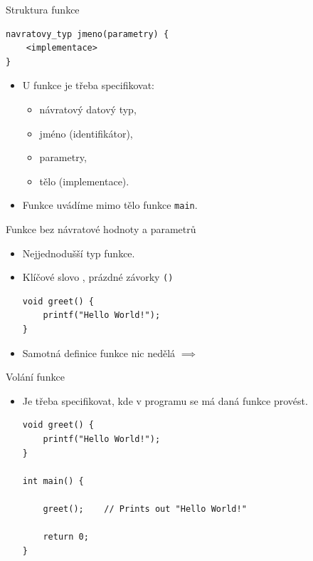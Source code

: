 \documentclass[14pt,aspectratio=169]{beamer}
\begin{document}
    \begin{frame}[t,fragile]{Struktura funkce}
        \begin{lstlisting}
navratovy_typ jmeno(parametry) {
    <implementace>
}
        \end{lstlisting}
        \begin{itemize}
            \item U funkce je třeba specifikovat:
            \begin{itemize}
                \item návratový datový typ,
                \item jméno (identifikátor),
                \item parametry,
                \item tělo (implementace).
            \end{itemize}
            \item Funkce uvádíme mimo tělo funkce \texttt{main}.
        \end{itemize}
    \end{frame}

    \begin{frame}[t,fragile]{Funkce bez návratové hodnoty a parametrů}
        \begin{itemize}
            \item Nejjednodušší typ funkce.
            \item Klíčové slovo , prázdné závorky \texttt{()}
            \begin{lstlisting}
void greet() {
    printf("Hello World!");
}
            \end{lstlisting}
            \item Samotná definice funkce nic nedělá $\implies$ 
        \end{itemize}
    \end{frame}

    \begin{frame}[t,fragile]{Volání funkce}
        \begin{itemize}
            \item Je třeba specifikovat, kde v programu se má daná funkce provést.
            \begin{lstlisting}
void greet() {
    printf("Hello World!");
}
            
int main() {

    greet();    // Prints out "Hello World!"

    return 0;
}
            \end{lstlisting}
        \end{itemize}
    \end{frame}
\end{document}
